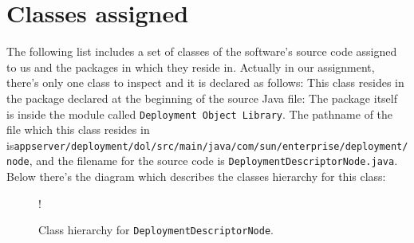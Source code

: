\newpage
\section{Classes assigned}
The following list includes a set of classes of the software's source code assigned to us and the packages in which they reside in.
Actually in our assignment, there's only one class to inspect and it is declared as follows:
This class resides in the package declared at the beginning of the source Java file:
The package itself is inside the module called \texttt{Deployment Object Library}. \newline
The pathname of the file which this class resides in is\newline \texttt{appserver/deployment/dol/src/main/java/com/sun/enterprise/deployment/node}, and the filename for the source code is \texttt{DeploymentDescriptorNode.java}.
Below there's the diagram which describes the classes hierarchy for this class:
\begin{figure}[H]
	\centering
	\resizebox{2.5in}
	{!}{}
	\caption{Class hierarchy for \texttt{DeploymentDescriptorNode}.}
\end{figure}